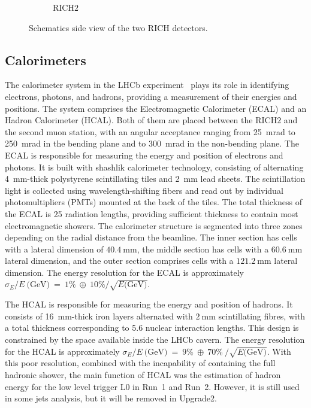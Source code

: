 \begin{figure}
\begin{subfigure}{0.48\textwidth}
    \caption{RICH$2$}\label{rich2}
    \end{subfigure}
    \caption{Schematics side view of the two RICH detectors.}
    \label{fig:rich}
\end{figure}

\subsection{Calorimeters}
\sloppy
The calorimeter system in the LHCb experiment~\cite{LHCb:2000vji} plays its role in identifying electrons, photons, and hadrons, providing a measurement of their energies and positions. The system comprises the Electromagnetic Calorimeter (ECAL) and an  Hadron Calorimeter (HCAL). Both of them are  placed between the RICH$2$ and the second muon station, with an angular acceptance ranging from \SI{25}{\milli\radian} to \SI{250}{\milli\radian} in the bending plane and to \SI{300}{\milli\radian} in the non-bending plane. 
The ECAL is responsible for measuring the energy and position of electrons and photons. It is built with shashlik calorimeter technology, consisting of alternating \SI{4}{\milli\meter}-thick polystyrene scintillating tiles and \SI{2}{\milli\meter} lead sheets. The scintillation light is collected using wavelength-shifting fibers and read out by individual photomultipliers (PMTs) mounted at the back of the tiles. The total thickness of the ECAL is 25 radiation lengths, providing sufficient thickness to contain most electromagnetic showers. The calorimeter structure is segmented into three zones depending on the radial distance from the beamline. The inner section has cells with a lateral dimension of $\SI{40.4}{\milli\meter}$, the middle section has cells with a $\SI{60.6}{\milli\meter}$ lateral dimension, and the outer section comprises cells with a $\SI{121.2}{\milli\meter}$ lateral dimension. The energy resolution for the ECAL is approximately 
 $\sigma_E/E~\text{(GeV)}~=~1\%~\oplus~10\%/\sqrt{E\text{(GeV)}}$.

\sloppy
The HCAL is responsible for measuring the energy and position of hadrons. It consists of \SI{16}{\milli\meter}-thick iron layers alternated with $\SI{2}{\milli\meter}$ scintillating fibres, with a total thickness corresponding to 5.6 nuclear interaction lengths. This design is constrained by the space available inside the LHCb cavern. The energy resolution for the HCAL is approximately $\sigma_E/E~\text{(GeV)}~=~9\%~\oplus~70\%~/\sqrt{E\text{(GeV)}}$. With this poor resolution, combined with the incapability of containing the full hadronic shower, the main function of HCAL was the estimation of hadron energy for the low level trigger L$0$ in Run~1 and Run~2. However, it is still used in some jets analysis, but it will be removed in Upgrade2.

